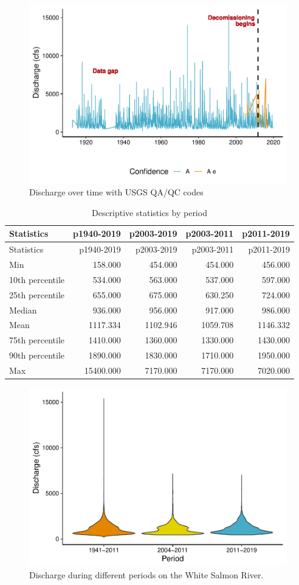 \documentclass[
  12pt,
]{article}
\begin{document}
\begin{figure}
\centering
\includegraphics{WhiteSalmon_WriteUp_files/figure-latex/fig2-1.pdf}
\caption{Discharge over time with USGS QA/QC codes}
\end{figure}

\newpage

\begin{longtable}[]{@{}lrrrr@{}}
\caption{Descriptive statistics by period}\tabularnewline
\toprule
Statistics & p1940-2019 & p2003-2019 & p2003-2011 &
p2011-2019\tabularnewline
\midrule
\endfirsthead
\toprule
Statistics & p1940-2019 & p2003-2019 & p2003-2011 &
p2011-2019\tabularnewline
\midrule
\endhead
Min & 158.000 & 454.000 & 454.000 & 456.000\tabularnewline
10th percentile & 534.000 & 563.000 & 537.000 & 597.000\tabularnewline
25th percentile & 655.000 & 675.000 & 630.250 & 724.000\tabularnewline
Median & 936.000 & 956.000 & 917.000 & 986.000\tabularnewline
Mean & 1117.334 & 1102.946 & 1059.708 & 1146.332\tabularnewline
75th percentile & 1410.000 & 1360.000 & 1330.000 &
1430.000\tabularnewline
90th percentile & 1890.000 & 1830.000 & 1710.000 &
1950.000\tabularnewline
Max & 15400.000 & 7170.000 & 7170.000 & 7020.000\tabularnewline
\bottomrule
\end{longtable}

\begin{figure}
\centering
\includegraphics{WhiteSalmon_WriteUp_files/figure-latex/fig3-1.pdf}
\caption{Discharge during different periods on the White Salmon River.}
\end{figure}
\end{document}
